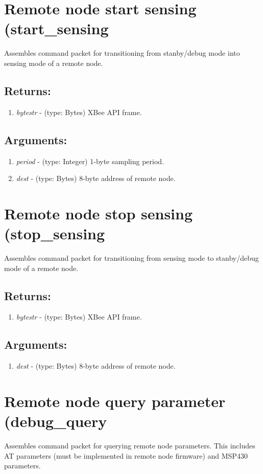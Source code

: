 \section{Remote node start sensing (start\_sensing}
Assembles command packet for transitioning from stanby/debug mode into sensing mode of a remote node.
\subsection{Returns:}
\begin{enumerate}
\item \emph{bytestr} - (type: Bytes) XBee API frame.
\end{enumerate}
\subsection{Arguments:}
\begin{enumerate}
\item \emph{period} - (type: Integer) 1-byte sampling period.
\item \emph{dest} - (type: Bytes) 8-byte address of remote node.
\end{enumerate}

\section{Remote node stop sensing (stop\_sensing}
Assembles command packet for transitioning from sensing mode to stanby/debug mode of a remote node.
\subsection{Returns:}
\begin{enumerate}
\item \emph{bytestr} - (type: Bytes) XBee API frame.
\end{enumerate}
\subsection{Arguments:}
\begin{enumerate}
\item \emph{dest} - (type: Bytes) 8-byte address of remote node.
\end{enumerate}

\section{Remote node query parameter (debug\_query}
Assembles command packet for querying remote node parameters. This includes AT parameters (must be implemented in remote node firmware) and MSP430 parameters.

